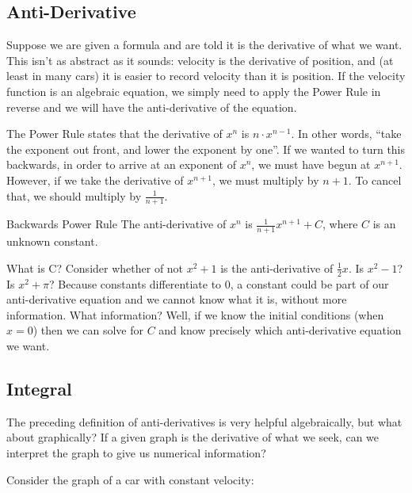 
\subsection{Anti-Derivative}



Suppose we are given a formula and are told it is the derivative of what we want.
This isn't as abstract as it sounds: velocity is the derivative of position, and (at least in 
many cars) it is easier to record velocity than it is position.  If the velocity
function is an algebraic equation, we simply need to apply the Power Rule
in reverse and we will have the anti-derivative of the equation.

The Power Rule states that the derivative of $x^n$ is $n\cdot x^{n-1}$.  In other words,
``take the exponent out front, and lower the exponent by one''.  If we wanted to
turn this backwards, in order to arrive at an exponent of $x^n$, we must have 
begun at $x^{n+1}$.  However, if we take the derivative of $x^{n+1}$, we must
multiply by $n+1$.  To cancel that, we should multiply by $\frac{1}{n+1}$.


\begin{derivation}{Backwards Power Rule}
The anti-derivative of $x^n$ is $\frac{1}{n+1} x^{n+1} + C$, where $C$ is an unknown
constant.
\end{derivation}


What is C?  Consider whether of not $x^2 +1$ is the anti-derivative of $\frac{1}{2}x$.
Is $x^2-1$?  Is $x^2+\pi$?  Because constants differentiate to 0, a constant could be 
part of our anti-derivative equation and we cannot know what it is, without more information.
What information?  Well, if we know the initial conditions (when $x=0$) then we can 
solve for $C$ and know precisely which anti-derivative equation we want.


\subsection{Integral}
The preceding definition of anti-derivatives is very helpful algebraically, but what about
graphically?  If a given graph is the derivative of what we seek, can we interpret the
graph to give us numerical information?

Consider the graph of a car with constant velocity:

